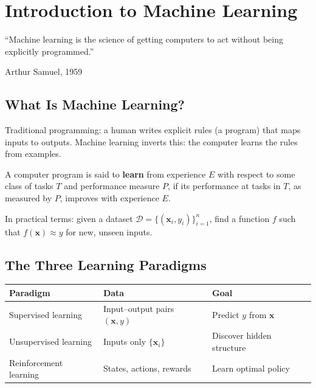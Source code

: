 \chapter{Introduction to Machine Learning}
\label{ch:introduction}

\epigraph{``Machine learning is the science of getting computers to act without being explicitly programmed.''}{Arthur Samuel, 1959}


\section{What Is Machine Learning?}

Traditional programming: a human writes explicit rules (a program) that maps inputs to outputs. Machine learning inverts this: the computer learns the rules from examples.

\begin{definition}
	A computer program is said to \textbf{learn} from experience $E$ with respect to some class of tasks $T$ and performance measure $P$, if its performance at tasks in $T$, as measured by $P$, improves with experience $E$.
\end{definition}

In practical terms: given a dataset $\mathcal{D} = \{(\mathbf{x}_i, y_i)\}_{i=1}^n$, find a function $f$ such that $f(\mathbf{x}) \approx y$ for new, unseen inputs.

\section{The Three Learning Paradigms}

\begin{longtable}{p{3cm}p{4.5cm}p{5cm}}
	\toprule
	\textbf{Paradigm}      & \textbf{Data}                         & \textbf{Goal}                 \\
	\midrule
	Supervised learning    & Input--output pairs $(\mathbf{x}, y)$ & Predict $y$ from $\mathbf{x}$ \\
	Unsupervised learning  & Inputs only $\{\mathbf{x}_i\}$        & Discover hidden structure     \\
	Reinforcement learning & States, actions, rewards              & Learn optimal policy          \\
	\bottomrule
\end{longtable}

